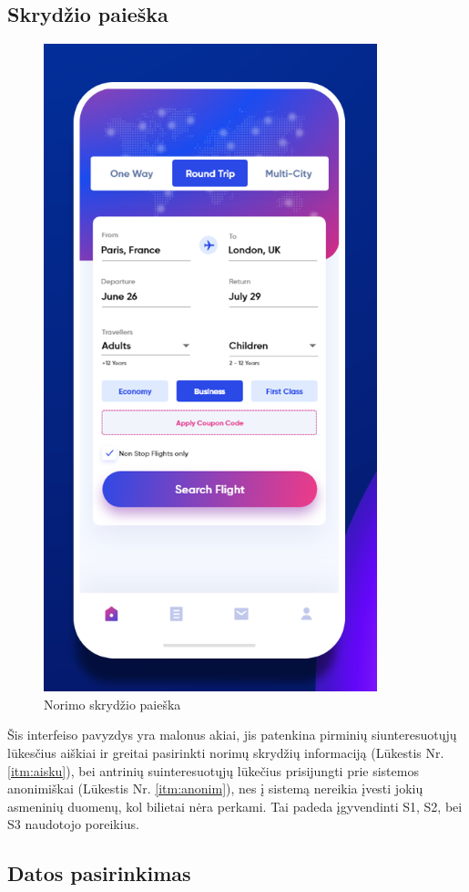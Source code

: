 \documentclass{VUMIFPSkursinis}
\begin{document}
\subsection{Skrydžio paieška}
\begin{figure}[H]
    \centering
    \includegraphics[scale=0.8]{img/info.png}
    \caption{Norimo skrydžio paieška}
    \label{img:info1}
\end{figure}
Šis interfeiso pavyzdys yra malonus akiai, jis patenkina pirminių siunteresuotųjų lūkesčius aiškiai ir greitai pasirinkti norimų skrydžių informaciją (Lūkestis Nr. \ref{itm:aisku}), bei antrinių suinteresuotųjų lūkečius prisijungti prie sistemos anonimiškai (Lūkestis Nr. \ref{itm:anonim}), nes į sistemą nereikia įvesti jokių asmeninių duomenų, kol bilietai nėra perkami.  Tai padeda įgyvendinti S1, S2, bei S3 naudotojo poreikius.

\subsection{Datos pasirinkimas}
\end{document}
